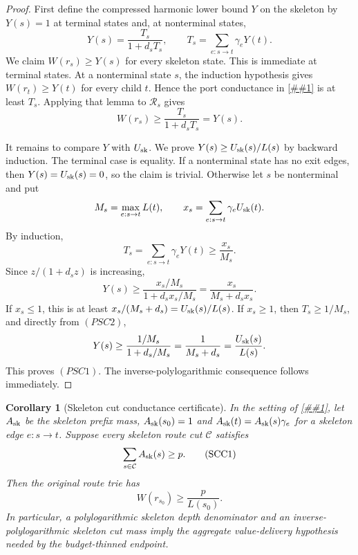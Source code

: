 \documentclass[10pt]{article}
\newcommand{\cref}[1]{\ref{##1}}
\newtheorem{corollary}[theorem]{Corollary}
\theoremstyle{definition}
\begin{document}
\begin{proof}
   First define the compressed harmonic lower bound \(Y\) on the skeleton by
   \(Y(s)=1\) at terminal states and, at nonterminal states,
   \[
      Y(s)=\frac{T_s}{1+d_sT_s},
      \qquad
      T_s=\sum_{e:s\to t}\gamma_eY(t).
      \tag{PSC2}
   \]
   We claim \(W(r_s)\ge Y(s)\) for every skeleton state.  This is immediate at
   terminal states.  At a nonterminal state \(s\), the induction hypothesis
   gives \(W(r_t)\ge Y(t)\) for every child \(t\).  Hence the port conductance
   in \cref{lem:ported-unit-region-contraction} is at least \(T_s\).  Applying
   that lemma to \(\mathcal R_s\) gives
   \[
      W(r_s)\ge\frac{T_s}{1+d_sT_s}=Y(s).
   \]

   It remains to compare \(Y\) with \(U_{\rm sk}\).  We prove
   \(Y(s)\ge U_{\rm sk}(s)/L(s)\) by backward induction.  The terminal case is
   equality.  If a nonterminal state has no exit edges, then
   \(Y(s)=U_{\rm sk}(s)=0\), so the claim is trivial.  Otherwise let \(s\) be
   nonterminal and put
   \[
      M_s=\max_{e:s\to t}L(t),
      \qquad
      x_s=\sum_{e:s\to t}\gamma_eU_{\rm sk}(t).
   \]
   By induction,
   \[
      T_s=\sum_{e:s\to t}\gamma_eY(t)
      \ge
      \frac{x_s}{M_s}.
   \]
   Since \(z/(1+d_sz)\) is increasing,
   \[
      Y(s)\ge
      \frac{x_s/M_s}{1+d_sx_s/M_s}
      =
      \frac{x_s}{M_s+d_sx_s}.
   \]
   If \(x_s\le1\), this is at least \(x_s/(M_s+d_s)=U_{\rm sk}(s)/L(s)\).
   If \(x_s\ge1\), then \(T_s\ge1/M_s\), and directly from \((PSC2)\),
   \[
      Y(s)\ge\frac{1/M_s}{1+d_s/M_s}
      =
      \frac1{M_s+d_s}
      =
      \frac{U_{\rm sk}(s)}{L(s)}.
   \]
   This proves \((PSC1)\).  The inverse-polylogarithmic consequence follows
   immediately.
\end{proof}

\begin{corollary}[Skeleton cut conductance certificate]
   \label{cor:skeleton-cut-conductance}
   In the setting of \cref{lem:port-skeleton-saturated-comparison}, let
   \(A_{\rm sk}\) be the skeleton prefix mass,
   \(A_{\rm sk}(s_0)=1\) and
   \(A_{\rm sk}(t)=A_{\rm sk}(s)\gamma_e\) for a skeleton edge \(e:s\to t\).
   Suppose every skeleton route cut \(\mathcal C\) satisfies
   \[
      \sum_{s\in\mathcal C}A_{\rm sk}(s)\ge p .
      \tag{SCC1}
   \]
   Then the original route trie has
   \[
      W(r_{s_0})
      \ge
      \frac{p}{L(s_0)}.
   \]
   In particular, a polylogarithmic skeleton depth denominator and an
   inverse-polylogarithmic skeleton cut mass imply the aggregate value-delivery
   hypothesis needed by the budget-thinned endpoint.
\end{corollary}
\end{document}
